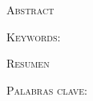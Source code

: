 \begin{center}
  {\Large \textsc{\textcolor{NavyBlue}{Abstract}}}
\end{center}
%
\noindent
%

\textsc{\textcolor{NavyBlue}{Keywords:}} 

\vspace{2cm}

\begin{center}
  {\Large \textsc{\textcolor{NavyBlue}{Resumen}}}
\end{center}
%
\noindent
%

\textsc{\textcolor{NavyBlue}{Palabras clave:}}